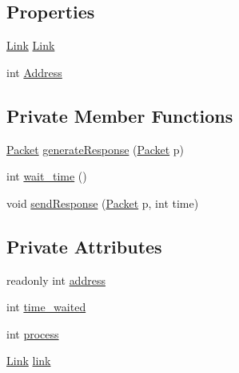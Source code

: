 \subsection*{Properties}
\begin{DoxyCompactItemize}
\item 
\hyperlink{classNetTrafficSimulator_1_1Link}{Link} \hyperlink{classNetTrafficSimulator_1_1ServerNode_a2fb3b251c8ad36760f68b8f7f4bc4c5b}{Link}
\item 
int \hyperlink{classNetTrafficSimulator_1_1ServerNode_a52165503cd66de69748e5e4e5b9cedd4}{Address}
\end{DoxyCompactItemize}
\subsection*{Private Member Functions}
\begin{DoxyCompactItemize}
\item 
\hyperlink{classNetTrafficSimulator_1_1Packet}{Packet} \hyperlink{classNetTrafficSimulator_1_1ServerNode_a96f3601328b5a86e3d69dcf93abafb34}{generate\-Response} (\hyperlink{classNetTrafficSimulator_1_1Packet}{Packet} p)
\item 
int \hyperlink{classNetTrafficSimulator_1_1ServerNode_a95a09cca40cf33abb200fa8c704f00a3}{wait\-\_\-time} ()
\item 
void \hyperlink{classNetTrafficSimulator_1_1ServerNode_ae90b2eb0a3abc8449a790a388dc1bcbb}{send\-Response} (\hyperlink{classNetTrafficSimulator_1_1Packet}{Packet} p, int time)
\end{DoxyCompactItemize}
\subsection*{Private Attributes}
\begin{DoxyCompactItemize}
\item 
readonly int \hyperlink{classNetTrafficSimulator_1_1ServerNode_a8be317d1e315710190755e4560fea3ef}{address}
\item 
int \hyperlink{classNetTrafficSimulator_1_1ServerNode_a3f25232ed46f3f83be0974fe060e390a}{time\-\_\-waited}
\item 
int \hyperlink{classNetTrafficSimulator_1_1ServerNode_a53521427dc9fa8eb16a461c4040d1b41}{process}
\item 
\hyperlink{classNetTrafficSimulator_1_1Link}{Link} \hyperlink{classNetTrafficSimulator_1_1ServerNode_a3968056516ee0dcb5ae111d09464efe6}{link}
\end{DoxyCompactItemize}


